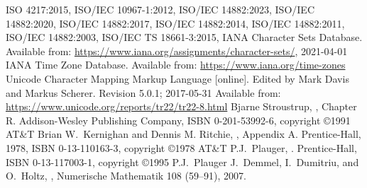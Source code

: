 
\renewcommand{\leftmark}{\bibname}

\begin{thebibliography}{99}
  ISO 4217:2015,
  ISO/IEC 10967-1:2012,
  ISO/IEC 14882:2023,
  ISO/IEC 14882:2020,
  ISO/IEC 14882:2017,
  ISO/IEC 14882:2014,
  ISO/IEC 14882:2011,
  ISO/IEC 14882:2003,
  ISO/IEC TS 18661-3:2015,
  IANA Character Sets Database.
  Available from:\newline
  \url{https://www.iana.org/assignments/character-sets/}, 2021-04-01
  IANA Time Zone Database.
  Available from: \url{https://www.iana.org/time-zones}
  Unicode Character Mapping Markup Language [online].
  Edited by Mark Davis and Markus Scherer. Revision 5.0.1; 2017-05-31
  Available from: \url{https://www.unicode.org/reports/tr22/tr22-8.html}
  Bjarne Stroustrup,
  , Chapter R\@.
  Addison-Wesley Publishing Company, ISBN 0-201-53992-6, copyright \copyright 1991 AT\&T
  Brian W.\ Kernighan and Dennis M. Ritchie,
  , Appendix A\@.
  Prentice-Hall, 1978, ISBN 0-13-110163-3, copyright \copyright 1978 AT\&T
  P.J.\ Plauger,
  .
  Prentice-Hall, ISBN 0-13-117003-1, copyright \copyright 1995 P.J.\ Plauger
  J.\ Demmel, I.\ Dumitriu, and O.\ Holtz,
  ,
  Numerische Mathematik 108 (59--91), 2007.

\end{thebibliography}
